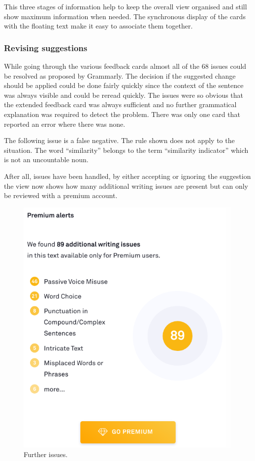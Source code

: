 \documentclass[runningheads]{llncs}
\let\OldTextregistered\textregistered
\renewcommand{\textregistered}{\OldTextregistered\xspace}
\begin{document}
This three stages of information help to keep the overall view organised and still show maximum information when needed. The synchronous display of the cards with the floating text make it easy to associate them together. 

\subsubsection{Revising suggestions}
While going through the various feedback cards almost all of the 68 issues could be resolved as proposed by Grammarly\textregistered. The decision if the suggested change should be applied could be done fairly quickly since the context of the sentence was always visible and could be reread quickly. The issues were so obvious that the extended feedback card was always sufficient and no further grammatical explanation was required to detect the problem. There was only one card that reported an error where there was none. 

The following issue is a false negative. The rule shown does not apply to the situation. The word ``similarity'' belongs to the term ``similarity indicator'' which is not an uncountable noun.


\noindent{}

After all, issues have been handled, by either accepting or ignoring the suggestion the view now shows how many additional writing issues are present but can only be reviewed with a premium account.

\begin{figure}[H]
  \includegraphics[width=0.8\linewidth]{images/premium.png}
  \caption{Further issues.}
  \label{fig:premium}
\end{figure}
\end{document}

